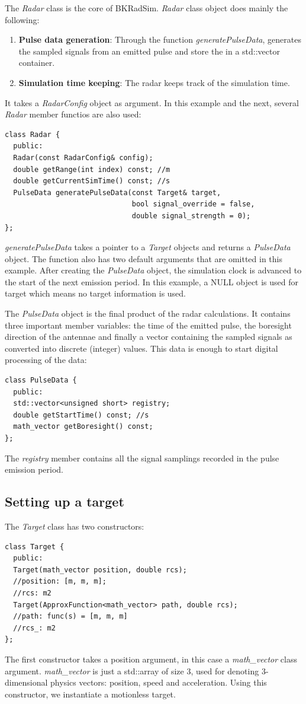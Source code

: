\documentclass[letterpaper]{book}
\begin{document}
The \textit{Radar} class is the core of BKRadSim. \textit{Radar} class object does mainly the following:
\begin{enumerate}
\item \textbf{Pulse data generation}: Through the function \textit{generatePulseData}, generates the sampled signals from an emitted pulse and store the in a std::vector container. 
\item \textbf{Simulation time keeping}: The radar keeps track of the simulation time. 
\end{enumerate}
It takes a \textit{RadarConfig} object as argument. In this example and the next, several \textit{Radar} member functios are also used:
\begin{lstlisting}
class Radar {
  public:
  Radar(const RadarConfig& config);
  double getRange(int index) const; //m
  double getCurrentSimTime() const; //s
  PulseData generatePulseData(const Target& target, 
                              bool signal_override = false,
                              double signal_strength = 0);                              
};
\end{lstlisting}
\textit{generatePulseData} takes a pointer to a \textit{Target} objects and returns a \textit{PulseData} object. The function also has two default arguments that are omitted in this example. After creating the \textit{PulseData} object, the simulation clock is advanced to the start of the next emission period. In this example, a NULL object is used for target which means no target information is used. 

The \textit{PulseData} object is the final product of the radar calculations. It contains three important member variables: the time of the emitted pulse, the boresight direction of the antennae and finally a vector containing the sampled signals as converted into discrete (integer) values. This data is enough to start digital processing of the data:
\begin{lstlisting}
class PulseData {
  public:
  std::vector<unsigned short> registry;
  double getStartTime() const; //s
  math_vector getBoresight() const;                      
};
\end{lstlisting}
The \textit{registry} member contains all the signal samplings recorded in the pulse emission period. 

\subsection{Setting up a target}
The \textit{Target} class has two constructors:
\begin{lstlisting}
class Target {
  public:
  Target(math_vector position, double rcs);
  //position: [m, m, m];
  //rcs: m2
  Target(ApproxFunction<math_vector> path, double rcs);
  //path: func(s) = [m, m, m]
  //rcs_: m2
};
\end{lstlisting}
The first constructor takes a position argument, in this case a \textit{math\_vector} class argument. \textit{math\_vector} is just a std::array of size 3, used for denoting 3-dimensional physics vectors: position, speed and acceleration. Using this constructor, we instantiate a motionless target. 
\end{document}
